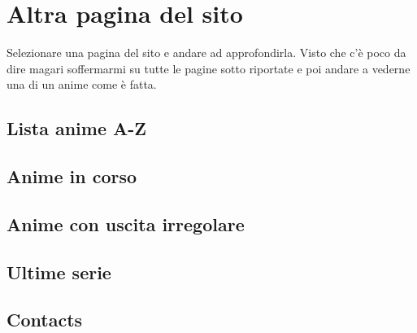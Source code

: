 \section{Altra pagina del sito}
Selezionare una pagina del sito e andare ad approfondirla. Visto che c'è poco da dire magari soffermarmi su tutte le pagine sotto riportate e poi andare a vederne una di un anime come è fatta.

\subsection{Lista anime A-Z}

\subsection{Anime in corso}

\subsection{Anime con uscita irregolare}

\subsection{Ultime serie}

\subsection{Contacts}